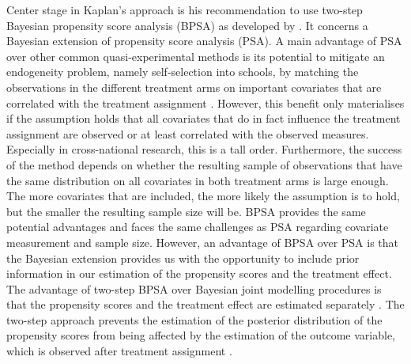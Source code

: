 \documentclass{article}
\begin{document}
Center stage in Kaplan's approach is his recommendation to use two-step Bayesian propensity score analysis (BPSA) as developed by \textcite{kaplan2012two}. It concerns a Bayesian extension of propensity score analysis (PSA). A main advantage of PSA over other common quasi-experimental methods is its potential to mitigate an endogeneity problem, namely self-selection into schools, by matching the observations in the different treatment arms on important covariates that are correlated with the treatment assignment \parencite{cordero_causal_2018}. However, this benefit only materialises if the assumption holds that all covariates that do in fact influence the treatment assignment are observed or at least correlated with the observed measures. Especially in cross-national research, this is a tall order. Furthermore, the success of the method depends on whether the resulting sample of observations that have the same distribution on all covariates in both treatment arms is large enough. The more covariates that are included, the more likely the assumption is to hold, but the smaller the resulting sample size will be. BPSA provides the same potential advantages and faces the same challenges as PSA regarding covariate measurement and sample size. However, an advantage of BPSA over PSA is that the Bayesian extension provides us with the opportunity to include prior information in our estimation of the propensity scores and the treatment effect. The advantage of two-step BPSA over Bayesian joint modelling procedures is that the propensity scores and the treatment effect are estimated separately \parencite{kaplan2012two}. The two-step approach prevents the estimation of the posterior distribution of the propensity scores from being affected by the estimation of the outcome variable, which is observed after treatment assignment \parencite{kaplan_causal_2016}.
\end{document}
